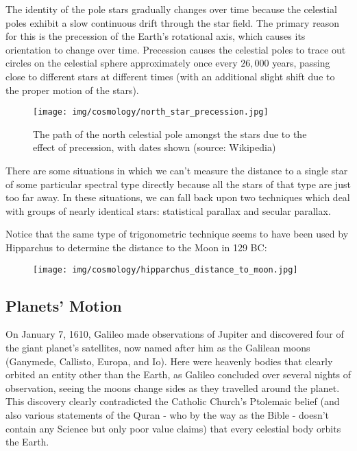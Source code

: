 	The identity of the pole stars gradually changes over time because the celestial poles exhibit a slow continuous drift through the star field. The primary reason for this is the precession of the Earth's rotational axis, which causes its orientation to change over time. Precession causes the celestial poles to trace out circles on the celestial sphere approximately once every $26,000$ years, passing close to different stars at different times (with an additional slight shift due to the proper motion of the stars).
	\begin{figure}[H]
		\centering
		\texttt{[image: img/cosmology/north\_star\_precession.jpg]}
		\caption[]{The path of the north celestial pole amongst the stars due to the effect of precession, with dates shown (source: Wikipedia)}
	\end{figure}
	
	\begin{tcolorbox}[title=Remark,colframe=black,arc=10pt]
	There are some situations in which we can't measure the distance to a single star of some particular spectral type directly because all the stars of that type are just too far away. In these situations, we can fall back upon two techniques which deal with groups of nearly identical stars: statistical parallax and secular parallax.
	\end{tcolorbox}
	Notice that the same type of trigonometric technique seems to have been used by Hipparchus to determine the distance to the Moon in 129 BC:
	\begin{figure}[H]
		\centering
		\texttt{[image: img/cosmology/hipparchus\_distance\_to\_moon.jpg]}
	\end{figure}
		
	\subsection{Planets' Motion}
	On January 7, 1610, Galileo made observations of Jupiter and discovered four of the giant planet's satellites, now named after him as the Galilean moons (Ganymede, Callisto, Europa, and Io). Here were heavenly bodies that clearly orbited an entity other than the Earth, as Galileo concluded over several nights of observation, seeing the moons change sides as they travelled around the planet. This discovery clearly contradicted the Catholic Church’s Ptolemaic belief (and also various statements of the Quran - who by the way as the Bible - doesn't contain any Science but only poor value claims) that every celestial body orbits the Earth.
	
